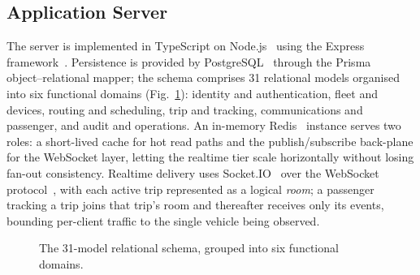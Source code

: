 \documentclass[conference]{IEEEtran}
\begin{document}
\subsection{Application Server}
The server is implemented in TypeScript on Node.js~\cite{nodejs} using the
Express framework~\cite{express}. Persistence is provided by
PostgreSQL~\cite{postgres} through the Prisma~\cite{prisma}
object--relational mapper; the schema comprises 31 relational models
organised into six functional domains (Fig.~\ref{fig:datamodel}): identity and
authentication, fleet
and devices, routing and scheduling, trip and tracking, communications and
passenger, and audit and operations. An in-memory Redis~\cite{redis} instance serves two
roles: a short-lived cache for hot read paths and the publish/subscribe
back-plane for the WebSocket layer, letting the realtime tier scale
horizontally without losing fan-out consistency.
Realtime delivery uses Socket.IO~\cite{socketio} over the WebSocket
protocol~\cite{rfc6455}, with each active trip represented as a
logical \emph{room}; a passenger tracking a trip joins that trip's room and
thereafter receives only its events, bounding per-client traffic to the
single vehicle being observed.

\begin{figure}[b]
\centering
{}
\caption{The 31-model relational schema, grouped into six functional domains.}
\label{fig:datamodel}
\end{figure}
\end{document}
